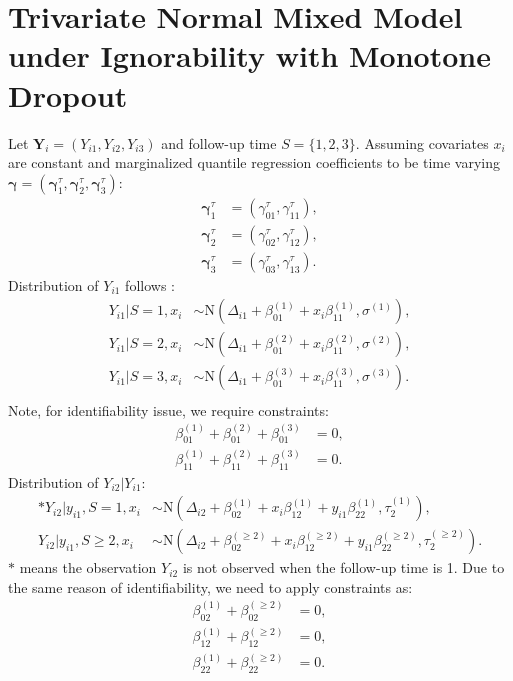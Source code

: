 \documentclass[12pt]{article}
\begin{document}
\section{Trivariate Normal Mixed Model under Ignorability with Monotone Dropout}
\label{sec:tri}
Let $\bm Y_i = (Y_{i1}, Y_{i2}, Y_{i3}) $ and follow-up time $S = \{1,
2, 3\}$. Assuming covariates $x_i$ are constant and marginalized quantile
regression coefficients to be time varying $\bm \gamma =
(\bm \gamma_1^{\tau}, \bm \gamma_2^{\tau}, \bm \gamma_3^{\tau})$:
\begin{align*}
  \bm \gamma_1^{\tau} & = (\gamma_{01}^{\tau}, \gamma^{\tau}_{11}), \\
  \bm \gamma_{2}^{\tau} & = (\gamma_{02}^{\tau}, \gamma^{\tau}_{12}), \\
  \bm \gamma_{3}^{\tau} & = (\gamma_{03}^{\tau}, \gamma^{\tau}_{13}).
\end{align*}
Distribution of $Y_{i1}$ follows :
\begin{align}
  \label{eq:tri1}
  Y_{i1}| S = 1, x_i & \sim \textrm{N}(\Delta_{i1} + \beta_{01}^{(1)} + x_i\beta_{11}^{(1)}, \sigma^{(1)}), \\
  Y_{i1}| S = 2, x_i & \sim \textrm{N}(\Delta_{i1} + \beta_{01}^{(2)} + x_i\beta_{11}^{(2)}, \sigma^{(2)}), \\
  Y_{i1}| S = 3, x_i & \sim \textrm{N}(\Delta_{i1} + \beta_{01}^{(3)} + x_i\beta_{11}^{(3)}, \sigma^{(3)}). \\
\end{align}
Note, for identifiability issue, we require constraints:
\begin{align}
  \label{eq:constbi1}
  \beta_{01}^{(1)} + \beta_{01}^{(2)} + \beta_{01}^{(3)}  & = 0 ,\\
  \beta_{11}^{(1)} + \beta_{11}^{(2)} + \beta_{11}^{(3)} & = 0 .
\end{align}
Distribution of $Y_{i2} | Y_{i1}$:
\begin{align}
  \label{eq:tri2}
  * Y_{i2} | y_{i1} , S = 1, x_i & \sim \textrm{N}(\Delta_{i2} + \beta_{02}^{(1)} + x_i\beta_{12}^{(1)} + y_{i1}\beta_{22}^{(1)}, \tau_2^{(1)}),  \\
  Y_{i2} | y_{i1} , S \geq 2, x_i & \sim \textrm{N}(\Delta_{i2} + \beta_{02}^{(\geq 2)} +
  x_i\beta_{12}^{(\geq 2)} + y_{i1}\beta_{22}^{(\geq 2)}, \tau_2^{(\geq 2)}).
\end{align}
$*$ means the observation $Y_{i2}$ is not observed when the follow-up
time is 1. Due to the same reason of identifiability, we need to apply constraints as:
\begin{align}
  \label{eq:constbi2}
  \beta_{02}^{(1)} + \beta_{02}^{(\geq 2)} & = 0 , \\
  \beta_{12}^{(1)} + \beta_{12}^{(\geq 2)} & = 0 , \\
  \beta_{22}^{(1)} + \beta_{22}^{(\geq 2)} & = 0 . \\
\end{align}
\end{document}
